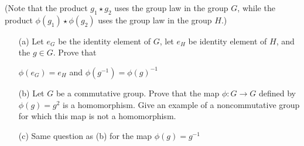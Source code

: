 (Note that the product $g_1 \star g_2$ uses the group law in the group $G$, while the product $\phi(g_1) \star \phi(g_2)$ uses the group law in the group $H$.)

\begin{enumerate}
    \item [(a)] Let $e_G$ be the identity element of $G$, let $e_H$ be identity element of $H$, and the $g \in G$. Prove that
    \begin{center}
        $\phi(e_G) = e_H$ \quad\quad and \quad\quad $\phi(g^{-1}) = \phi(g)^{-1}$
    \end{center}
    \item [(b)] Let $G$ be a commutative group. Prove that the map $\phi: G \rightarrow G$ defined by $\phi(g)=g^2$ is a homomorphism. Give an example of a noncommutative group for which this map is not a homomorphism.
    \item [(c)] Same question as (b) for the map $\phi(g)=g^{-1}$
\end{enumerate}

